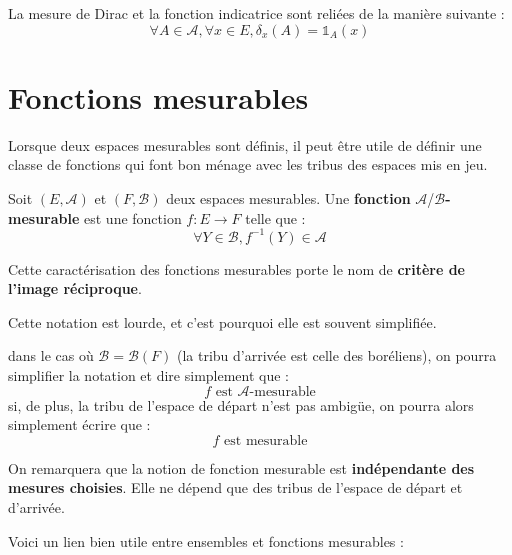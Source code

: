 \documentclass[../integ-proba.tex]{subfiles}
\begin{document}
  \begin{rem}
    La mesure de Dirac et la fonction indicatrice sont reliées de la manière suivante :
    $$
    \forall A \in \mathcal{A}, \forall x \in E, \delta_x(A)=\mathds{1}_A(x)
    $$
  \end{rem}

  \section{Fonctions mesurables}

  Lorsque deux espaces mesurables sont définis, il peut être utile de définir une classe de fonctions qui font bon ménage avec les tribus des espaces mis en jeu.

  \begin{defi}
    Soit $\left(E, \mathcal{A}\right)$ et $\left(F, \mathcal{B}\right)$ deux espaces mesurables.
    Une \textbf{fonction } $\mathcal{A}$/$\mathcal{B}$\textbf{-mesurable} est une fonction $f : E \longrightarrow F$ telle que :
    $$ \forall Y \in \mathcal{B}, f^{-1}(Y) \in \mathcal{A} $$
  \end{defi}

  \begin{rem}
    Cette caractérisation des fonctions mesurables porte le nom de \textbf{critère de l'image réciproque}.
  \end{rem}

  \begin{rem}
    \label{rem:simplification_notation_fonctions_mesurables}
    Cette notation est lourde, et c'est pourquoi elle est souvent simplifiée.
    \begin{itemize}
    \itemb dans le cas où $\mathcal{B}=\mathcal{B}\left(F\right)$ (la tribu d'arrivée est celle des boréliens), on pourra simplifier la notation et dire simplement que :
    $$
    f \text{ est } \mathcal{A}\text{-mesurable}
    $$
    \itemb si, de plus, la tribu de l'espace de départ n'est pas ambigüe, on pourra alors simplement écrire que :
    $$
    f \text{ est mesurable}
    $$
    \end{itemize}
  \end{rem}

  \begin{rem}
    On remarquera que la notion de fonction mesurable est \textbf{indépendante des mesures choisies}.
    Elle ne dépend que des tribus de l'espace de départ et d'arrivée.
  \end{rem}

  Voici un lien bien utile entre ensembles et fonctions mesurables :
\end{document}
